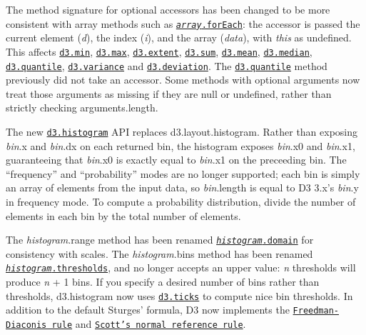 The method signature for optional accessors has been changed to be more consistent with array methods such as \href{https://developer.mozilla.org/en-US/docs/Web/JavaScript/Reference/Global_Objects/Array/forEach}{\tt {\itshape array}.for\+Each}\+: the accessor is passed the current element ({\itshape d}), the index ({\itshape i}), and the array ({\itshape data}), with {\itshape this} as undefined. This affects \href{https://github.com/d3/d3-array/blob/master/README.md#min}{\tt d3.\+min}, \href{https://github.com/d3/d3-array/blob/master/README.md#max}{\tt d3.\+max}, \href{https://github.com/d3/d3-array/blob/master/README.md#extent}{\tt d3.\+extent}, \href{https://github.com/d3/d3-array/blob/master/README.md#sum}{\tt d3.\+sum}, \href{https://github.com/d3/d3-array/blob/master/README.md#mean}{\tt d3.\+mean}, \href{https://github.com/d3/d3-array/blob/master/README.md#median}{\tt d3.\+median}, \href{https://github.com/d3/d3-array/blob/master/README.md#quantile}{\tt d3.\+quantile}, \href{https://github.com/d3/d3-array/blob/master/README.md#variance}{\tt d3.\+variance} and \href{https://github.com/d3/d3-array/blob/master/README.md#deviation}{\tt d3.\+deviation}. The \href{https://github.com/d3/d3-array/blob/master/README.md#quantile}{\tt d3.\+quantile} method previously did not take an accessor. Some methods with optional arguments now treat those arguments as missing if they are null or undefined, rather than strictly checking arguments.\+length.

The new \href{https://github.com/d3/d3-array/blob/master/README.md#histograms}{\tt d3.\+histogram} A\+PI replaces d3.\+layout.\+histogram. Rather than exposing {\itshape bin}.x and {\itshape bin}.dx on each returned bin, the histogram exposes {\itshape bin}.x0 and {\itshape bin}.x1, guaranteeing that {\itshape bin}.x0 is exactly equal to {\itshape bin}.x1 on the preceeding bin. The “frequency” and “probability” modes are no longer supported; each bin is simply an array of elements from the input data, so {\itshape bin}.length is equal to D3 3.\+x’s {\itshape bin}.y in frequency mode. To compute a probability distribution, divide the number of elements in each bin by the total number of elements.

The {\itshape histogram}.range method has been renamed \href{https://github.com/d3/d3-array/blob/master/README.md#histogram_domain}{\tt {\itshape histogram}.domain} for consistency with scales. The {\itshape histogram}.bins method has been renamed \href{https://github.com/d3/d3-array/blob/master/README.md#histogram_thresholds}{\tt {\itshape histogram}.thresholds}, and no longer accepts an upper value\+: {\itshape n} thresholds will produce {\itshape n} + 1 bins. If you specify a desired number of bins rather than thresholds, d3.\+histogram now uses \href{https://github.com/d3/d3-array/blob/master/README.md#ticks}{\tt d3.\+ticks} to compute nice bin thresholds. In addition to the default Sturges’ formula, D3 now implements the \href{https://github.com/d3/d3-array/blob/master/README.md#thresholdFreedmanDiaconis}{\tt Freedman-\/\+Diaconis rule} and \href{https://github.com/d3/d3-array/blob/master/README.md#thresholdScott}{\tt Scott’s normal reference rule}.

